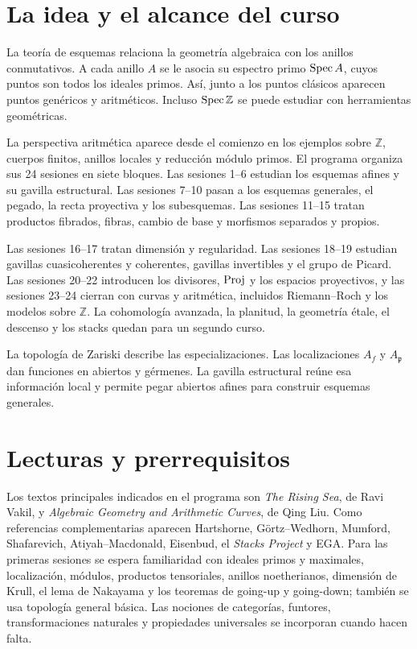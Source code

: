 \section{La idea y el alcance del curso}

La teoría de esquemas relaciona la geometría algebraica con los anillos conmutativos. A cada anillo $A$ se le asocia su espectro primo $\operatorname{Spec} A$, cuyos puntos son todos los ideales primos. Así, junto a los puntos clásicos aparecen puntos genéricos y aritméticos. Incluso $\operatorname{Spec}\mathbb Z$ se puede estudiar con herramientas geométricas.

La perspectiva aritmética aparece desde el comienzo en los ejemplos sobre $\mathbb Z$, cuerpos finitos, anillos locales y reducción módulo primos. El programa organiza sus 24 sesiones en siete bloques. Las sesiones 1–6 estudian los esquemas afines y su gavilla estructural. Las sesiones 7–10 pasan a los esquemas generales, el pegado, la recta proyectiva y los subesquemas. Las sesiones 11–15 tratan productos fibrados, fibras, cambio de base y morfismos separados y propios.

Las sesiones 16–17 tratan dimensión y regularidad. Las sesiones 18–19 estudian gavillas cuasicoherentes y coherentes, gavillas invertibles y el grupo de Picard. Las sesiones 20–22 introducen los divisores, $\operatorname{Proj}$ y los espacios proyectivos, y las sesiones 23–24 cierran con curvas y aritmética, incluidos Riemann--Roch y los modelos sobre $\mathbb Z$. La cohomología avanzada, la planitud, la geometría étale, el descenso y los stacks quedan para un segundo curso.

La topología de Zariski describe las especializaciones. Las localizaciones $A_f$ y $A_{\mathfrak p}$ dan funciones en abiertos y gérmenes. La gavilla estructural reúne esa información local y permite pegar abiertos afines para construir esquemas generales.

\section{Lecturas y prerrequisitos}

Los textos principales indicados en el programa son \emph{The Rising Sea}, de Ravi Vakil, y \emph{Algebraic Geometry and Arithmetic Curves}, de Qing Liu. Como referencias complementarias aparecen Hartshorne, Görtz--Wedhorn, Mumford, Shafarevich, Atiyah--Macdonald, Eisenbud, el \emph{Stacks Project} y EGA. Para las primeras sesiones se espera familiaridad con ideales primos y maximales, localización, módulos, productos tensoriales, anillos noetherianos, dimensión de Krull, el lema de Nakayama y los teoremas de going-up y going-down; también se usa topología general básica. Las nociones de categorías, funtores, transformaciones naturales y propiedades universales se incorporan cuando hacen falta.

